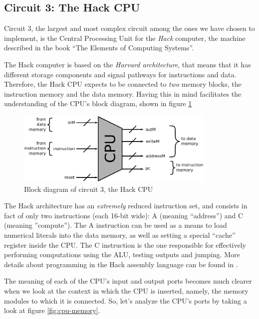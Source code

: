 \documentclass[a4paper]{article}
\begin{document}
        \subsection{Circuit 3: The Hack CPU}
        \label{subsec:hack-cpu-circuit}
            Circuit 3, the largest and most complex circuit among the ones we have chosen to
            implement, is the Central Processing Unit for the \emph{Hack} computer, the machine
            described in the book ``The Elements of Computing Systems''\cite{nand2tetris-book}.

            The Hack computer is based on the \emph{Harvard architecture}, that means that it has
            different storage components and signal pathways for instructions and data. Therefore,
            the Hack CPU expects to be connected to \emph{two} memory blocks, the instruction memory
            and the data memory. Having this in mind facilitates the understanding of the CPU's
            block diagram, shown in figure \ref{fig:cpu-block}

            \begin{figure}[H]
                \centerline{\includegraphics[width=0.85\textwidth]{imgs/cpu-block.pdf}}
                \caption{Block diagram of circuit 3, the Hack CPU
                    \label{fig:cpu-block}}
            \end{figure}

            The Hack architecture has an \emph{extremely} reduced instruction set, and consists in
            fact of only two instructions (each 16-bit wide): A (meaning ``address'') and
            C (meaning ''compute''). The A instruction can be used as a means to load numerical
            literals into the data memory, as well as setting a special ``cache'' register inside
            the CPU. The C instruction is the one responsible for effectively performing
            computations using the ALU, testing outputs and jumping. More details about programming
            in the Hack assembly language can be found in \cite{nand2tetris-chapter-assembly}.

            The meaning of each of the CPU's input and output ports becomes much clearer when we
            look at the context in which the CPU is inserted, namely, the memory modules to which it
            is connected. So, let's analyze the CPU's ports by taking a look at figure
            \ref{fig:cpu-memory}.
\end{document}

